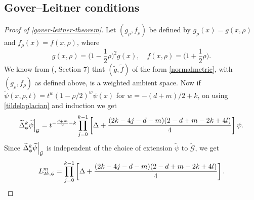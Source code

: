 \documentclass{amsart}
\newcommand\restr[2]{{%
  \left.\kern-\nulldelimiterspace %
  #1 %
  \right|_{#2} %
  }}
\begin{document}
\subsection{ Gover--Leitner conditions}
\begin{proof}[Proof of \cref{gover-leitner-theorem}]
Let $(g_\rho,f_\rho)$ be defined {by $g_\rho(x)=g(x,\rho)$ and $f_\rho(x)=f(x,\rho)$, where}
\begin{equation*}
g(x,\rho)=\big(1-\frac{1}{2}\rho\big)^2 g(x),\quad  f(x,\rho)=\big(1+\frac{1}{2}\rho\big). 
\end{equation*}
We know from (\cites{CaseKhaitan2022}, Section 7) that $(\widetilde{g},\widetilde{f})$ of the form \cref{normalmetric}, with $(g_\rho,f_\rho)$ {as defined above}, is a weighted ambient space.
Now if $\widetilde{\psi}(x,\rho,t)=t^w\left(1-\rho/2\right)^{w} \psi(x)$ for 
$w=-(d+m)/2+k$, on using \cref{tildelaplacian} and induction we get 
\begin{equation*}
\restr{\widetilde{\Delta}^k_\phi\widetilde{\psi}}{\mathcal{G}} =t^{-\frac{d+m}{2}-k}\prod_{j=0}^{k-1}\left[\Delta+\frac{(2 k-4 j-d-m)(2-d+m-2 k+4 l)}{4}\right]\psi.
\end{equation*}
Since $\restr{\widetilde{\Delta}^k_\phi\widetilde{\psi}}{\mathcal{G}}$ is independent of the choice of extension $\widetilde{\psi}$ to $\widetilde{\mathcal{G}}$, we get 
\begin{equation*}
L_{2k,\phi}^m =\prod_{j=0}^{k-1}\left[\Delta+\frac{(2 k-4 j-d-m)(2-d+m-2 k+4 l)}{4}\right].\qedhere
\end{equation*}
\end{proof}
\end{document}

